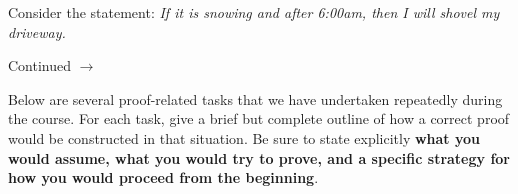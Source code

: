 \documentclass[addpoints]{exam}
\def\pageturn{\vfill
\begin{flushright}
	\begin{small}
		Continued $\rightarrow$
	\end{small}
\end{flushright}
\newpage}
\begin{document}
\begin{questions}
	
	

\question Consider the statement: 		\emph{If it is snowing and after 6:00am, then I will shovel my driveway.}



\pageturn

% 	




\question Below are several proof-related tasks that we have undertaken repeatedly during the course. For each task, give a brief but complete outline of how a correct proof would be constructed in that situation. Be sure to state explicitly \textbf{what you would assume,  what you would try to prove, and a  specific strategy for how you would proceed from the beginning}. 
	\begin{parts}

\end{parts}
\end{questions}
\end{document}
